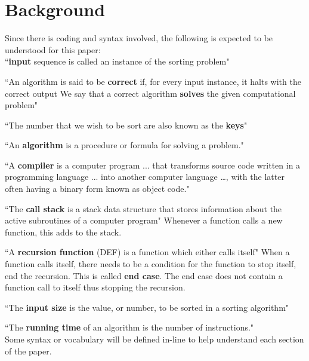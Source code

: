 \documentclass[12pt]{article}
\begin{document}
	\section{Background} %
	
	Since there is coding and syntax involved, the following is expected to be understood for this paper:\\
	
	``\textbf{input} sequence is called an instance of the sorting problem"\cite[p.~5]{intro}
	
	``An algorithm is said to be \textbf{correct} if, for every input instance, it halts with the correct output
	We say that a correct algorithm \textbf{solves} the given computational problem"\cite[p.~6]{intro}
	
	``The number that we wish to be sort are also known as the \textbf{keys}"\cite[p.~16]{intro}
	
	``An \textbf{algorithm} is a procedure or formula for solving a problem."\cite{intro}
	
	``A \textbf{compiler} is a computer program ... that transforms source code written in a programming language ... into another computer language …, with the latter often having a binary form known as object code."\cite{intro}
	
	``The \textbf{call stack} is a stack data structure that stores information about the active subroutines of a computer program"\cite{wiki-callStack} Whenever a function calls a new function, this adds to the stack.
	
	``A \textbf{recursion function} (DEF) is a function which either calls itself"\cite{wiki-recursiveFunction} When a function calls itself, there needs to be a condition for the function to stop itself, end the recursion.
	This is called \textbf{end case}.
	The end case does not contain a function call to itself thus stopping the recursion.
	
	``The \textbf{input size} is the value, or number, to be sorted in a sorting algorithm"\cite{intro}
	
	``The \textbf{running time} of an algorithm is the number of instructions."\cite{intro}\\
	
	Some syntax or vocabulary will be defined in-line to help understand each section of the paper.
	
\end{document}
